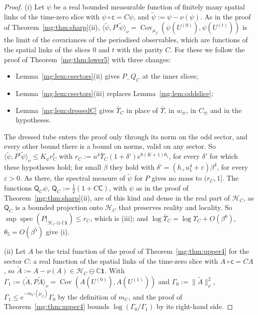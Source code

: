 \documentclass[11pt,a4paper]{article}
\theoremstyle{definition}
\theoremstyle{remark}
\DeclareMathOperator{\Cov}{Cov}
\DeclareMathOperator{\spec}{spec}
\newcommand{\ip}[2]{\langle #1,#2\rangle}
\newcommand{\C}{\mathbb{C}}
\newcommand{\norm}[1]{\lVert #1\rVert}
\begin{document}
\begin{proof}
(i) Let $\psi$ be a real bounded measurable function of finitely many spatial links of the time-zero slice with $\psi\circ\mathsf c=C\psi$, and $\tilde\psi:=\psi-\nu(\psi)$. As in
the proof of Theorem~\ref{mg:thm:sharp}(ii), $\ip{\tilde\psi}{P^t\tilde\psi}_\nu=\Cov_{\mu_\beta}(\psi(U^{(0)}),\psi(U^{(t)}))$ is the limit of the covariances of the periodised
observables, which are functions of the spatial links of the slices $0$ and $t$ with the parity $C$. For these we follow the proof of Theorem~\ref{mg:thm:lower5} with three changes:
\begin{itemize}
\item Lemma~\ref{mg:lem:csectors}(ii) gives $P_-Q_C$ at the inner slices;
\item Lemma~\ref{mg:lem:csectors}(iii) replaces Lemma~\ref{mg:lem:oddslice};
\item Lemma~\ref{mg:lem:dressedC} gives $\bar\Upsilon_C$ in place of $\bar\Upsilon$, in $w_\varpi$, in $C_\varpi$ and in the hypotheses.
\end{itemize}
The dressed tube enters the proof only through its norm on the odd sector, and every other bound there is a bound on norms, valid on any sector. So
$\ip{\tilde\psi}{P^t\tilde\psi}_\nu\le K_\psi r_C^t$ with $r_C:=u^4\bar\Upsilon_C(1+\delta')e^{8(K+1)\theta_5}$, for every $\delta'$ for which these hypotheses hold; for small $\beta$ they
hold with $\delta'=(h_+u_1^4+\varepsilon)\beta^4$, for every $\varepsilon>0$.
As there, the spectral measure of $\tilde\psi$ for $P$ gives no mass to $(r_C,1]$. The functions $\mathsf Q_C\psi$, $\mathsf Q_C:=\frac12(1+C\mathsf C)$, with $\psi$ as in the proof of
Theorem~\ref{mg:thm:sharp}(ii), are of this kind and dense in the real part of $\mathcal H_C$, as $\mathsf Q_C$ is a bounded projection onto $\mathcal H_C$ that preserves reality and
locality. So $\sup\spec(P|_{\mathcal H_C\ominus\C\mathbf1})\le r_C$, which is (iii); and $\log\bar\Upsilon_C=\log\Upsilon_C+O(\beta^6)$, $\theta_5=O(\beta^5)$ give (i).

(ii) Let $A$ be the trial function of the proof of Theorem~\ref{mg:thm:upper4} for the sector $C$: a real function of the spatial links of the time-zero slice with
$A\circ\mathsf c=CA$, so $\tilde A:=A-\nu(A)\in\mathcal H_C\ominus\C\mathbf1$. With $\Gamma_1:=\ip{\tilde A}{P\tilde A}_\nu=\Cov(A(U^{(0)}),A(U^{(1)}))$ and $\Gamma_0:=\norm{\tilde A}^2_\nu$,
$\Gamma_1\le e^{-m_C(\mu_\beta)}\Gamma_0$ by the definition of $m_C$, and the proof of Theorem~\ref{mg:thm:upper4} bounds $\log(\Gamma_0/\Gamma_1)$ by its right-hand side.
\end{proof}
\end{document}
